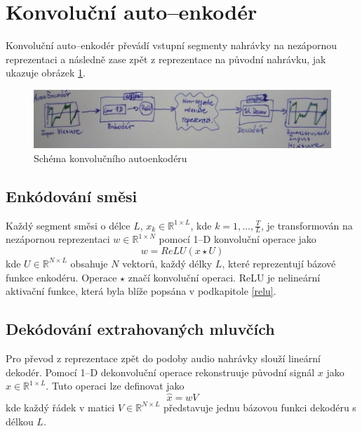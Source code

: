 
\section{Konvoluční auto--enkodér}
Konvoluční auto--enkodér převádí vstupní segmenty nahrávky na nezápornou reprezentaci a následně zase zpět z reprezentace na původní nahrávku, jak ukazuje obrázek \ref{fig:tasnet-autoenkoder}.
\begin{figure}[H]
    \centering
    \includegraphics[scale=0.5]{obrazky-figures/autoenkoder.png}
    \caption{\label{fig:tasnet-autoenkoder}Schéma konvolučního autoenkodéru}
\end{figure}


\subsection{Enkódování směsi}
Každý segment směsi o délce $L$, $x_k \in \mathbb{R}^{1 \times L}$, kde $k = 1, \dots, \frac{T}{L}$, je transformován na nezápornou reprezentaci $w \in \mathbb{R}^{1 \times N}$ pomocí 1--D konvoluční operace jako
\begin{equation}
  	w = ReLU(x \star U)
\end{equation}
kde $U \in \mathbb{R}^{N \times L}$ obsahuje $N$ vektorů, každý délky $L$, které reprezentují bázové funkce enkodéru. Operace \textcircled{$\star$} značí konvoluční operaci. ReLU je nelineární aktivační funkce, která byla blíže popsána v podkapitole \ref{relu}.


\subsection{Dekódování extrahovaných mluvčích}
Pro převod z reprezentace zpět do podoby audio nahrávky slouží lineární dekodér. Pomocí 1--D dekonvoluční operace rekonstruuje původní signál $x$ jako $x \in \mathbb{R}^{1 \times L}$. Tuto operaci lze definovat jako 
\begin{equation}
  \hat{x} = wV
\end{equation}
kde každý řádek v matici $V \in \mathbb{R}^{N \times L}$ představuje jednu bázovou funkci dekodéru s délkou $L$.

